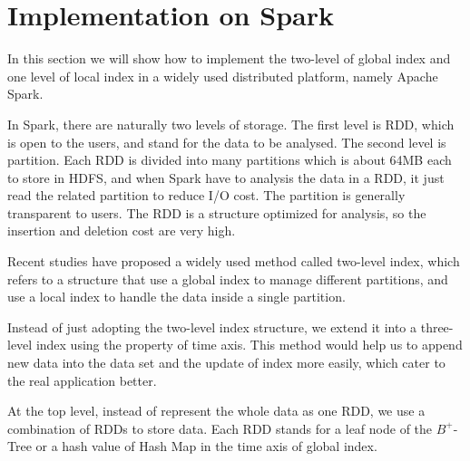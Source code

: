 \documentclass[sigplan]{acmart}
\begin{document}
\section{Implementation on Spark}
In this section we will show how to implement the two-level of global index and one level of local index in a widely used distributed platform, namely Apache Spark.\par
In Spark, there are naturally two levels of storage. The first level is RDD, which is open to the users, and stand for the data to be analysed. The second level is partition. Each RDD is divided into many partitions which is about 64MB each to store in HDFS, and when Spark have to analysis the data in a RDD, it just read the related partition to reduce I/O cost. The partition is generally transparent to users. The RDD is a structure optimized for analysis, so the insertion and deletion cost are very high.\par
Recent studies have proposed a widely used method called two-level index, which refers to a structure that use a global index to manage different partitions, and use a local index to handle the data inside a single partition.\par
Instead of just adopting the two-level index structure, we extend it into a three-level index using the property of time axis. This method would help us to append new data into the data set and the update of index more easily, which cater to the real application better.\par
At the top level, instead of represent the whole data as one RDD, we use a combination of RDDs to store data. Each RDD stands for a leaf node of the $B^+$-Tree or a hash value of Hash Map in the time axis of global index.




\end{document}
